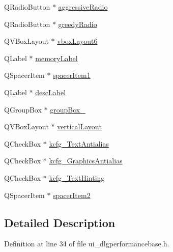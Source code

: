 \begin{DoxyCompactItemize}
\item 
Q\+Radio\+Button $\ast$ \hyperlink{classUi__DlgPerformanceBase_a87fd4332c8e17d282219978817ae8e4f}{aggressive\+Radio}
\item 
Q\+Radio\+Button $\ast$ \hyperlink{classUi__DlgPerformanceBase_a211428e98a80beed21710b83d2c937c4}{greedy\+Radio}
\item 
Q\+V\+Box\+Layout $\ast$ \hyperlink{classUi__DlgPerformanceBase_a5e1a35e3b393bb87cf89a1546138f186}{vbox\+Layout6}
\item 
Q\+Label $\ast$ \hyperlink{classUi__DlgPerformanceBase_af6390efa23e0a86a5e32abea47e8f7bf}{memory\+Label}
\item 
Q\+Spacer\+Item $\ast$ \hyperlink{classUi__DlgPerformanceBase_a89feb5da157af59094ed58ae423ec7d9}{spacer\+Item1}
\item 
Q\+Label $\ast$ \hyperlink{classUi__DlgPerformanceBase_a81970ae031653bae2f63fe1e5c390e59}{desc\+Label}
\item 
Q\+Group\+Box $\ast$ \hyperlink{classUi__DlgPerformanceBase_a9c18db71e6b225bedfe650309a347b59}{group\+Box\+\_}
\item 
Q\+V\+Box\+Layout $\ast$ \hyperlink{classUi__DlgPerformanceBase_a76a6b51ca5ca1453077c22f2622a33cf}{vertical\+Layout}
\item 
Q\+Check\+Box $\ast$ \hyperlink{classUi__DlgPerformanceBase_ac4dd2f966263b10e62eb0e13be099c7c}{kcfg\+\_\+\+Text\+Antialias}
\item 
Q\+Check\+Box $\ast$ \hyperlink{classUi__DlgPerformanceBase_af914dbe5898bd1c2e48be6cce58738f3}{kcfg\+\_\+\+Graphics\+Antialias}
\item 
Q\+Check\+Box $\ast$ \hyperlink{classUi__DlgPerformanceBase_a74b774561fae047471009b814b7e7f86}{kcfg\+\_\+\+Text\+Hinting}
\item 
Q\+Spacer\+Item $\ast$ \hyperlink{classUi__DlgPerformanceBase_a0bd18580deb85e001791945f5bfdca5b}{spacer\+Item2}
\end{DoxyCompactItemize}


\subsection{Detailed Description}


Definition at line 34 of file ui\+\_\+dlgperformancebase.\+h.



